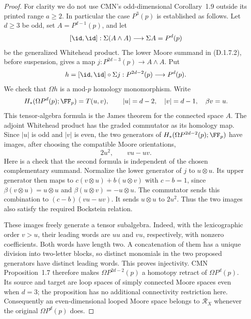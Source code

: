\begin{proof}
For clarity we do not use CMN's odd-dimensional Corollary~1.9
outside its printed range $a\geq2$. In particular the case
$P^3(p)$ is established as follows. Let $d\geq3$ be odd, set
$A=P^{d-1}(p)$, and let
\[
 [\id,\id]:\Sigma(A\wedge A)\longrightarrow\Sigma A=P^d(p)
\]
be the generalized Whitehead product. The lower Moore summand in
(D.1.7.2), before suspension, gives a map
$j:P^{2d-3}(p)\to A\wedge A$. Put
\[
 h=[\id,\id]\circ\Sigma j:P^{2d-2}(p)\longrightarrow P^d(p).
\]
We check that $\Omega h$ is a mod-$p$ homology monomorphism.
Write
\[
 H_*(\Omega P^d(p);\FF_p)=T(u,v),\qquad
 |u|=d-2,\quad |v|=d-1,\quad\beta v=u.
\]
This tensor-algebra formula is the James theorem for the connected
space $A$. The adjoint Whitehead product has the graded commutator
as its homology map. Since $|u|$ is odd and $|v|$ is even, the
two generators of $H_*(\Omega P^{2d-2}(p);\FF_p)$ have images,
after choosing the compatible Moore orientations,
\[
                  2u^2,\qquad vu-uv.                \tag{D.1.7.4}
\]
Here is a check that the second formula is independent of the
chosen complementary summand. Normalize the lower generator of
$j$ to $u\otimes u$. Its upper generator then maps to
$c(v\otimes u)+b(u\otimes v)$ with $c-b=1$, since
$\beta(v\otimes u)=u\otimes u$ and
$\beta(u\otimes v)=-u\otimes u$. The commutator sends this
combination to $(c-b)(vu-uv)$. It sends $u\otimes u$ to $2u^2$.
Thus the two images also satisfy the required Bockstein relation.

These images freely generate a tensor subalgebra. Indeed, with
the lexicographic order $v>u$, their leading words are $uu$ and
$vu$, respectively, with nonzero coefficients. Both words have
length two. A concatenation of them has a unique division into
two-letter blocks, so distinct monomials in the two proposed
generators have distinct leading words. This proves injectivity.
CMN Proposition~1.7 therefore makes $\Omega P^{2d-2}(p)$ a
homotopy retract of $\Omega P^d(p)$. Its source and target are
loop spaces of simply connected Moore spaces even when $d=3$;
the proposition has no additional connectivity restriction here.
Consequently an even-dimensional looped Moore space belongs to
$\mathcal R_X$ whenever the original $\Omega P^d(p)$ does.


\end{proof}
